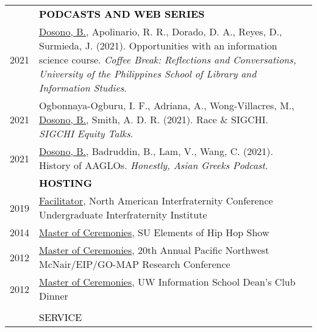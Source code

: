 \documentclass[11pt]{article}
\begin{document}
{{\begin{longtable}{Rp{0.75in}p{5.0in}}
\pagebreak

& \textcolor{black}{\uppercase{\textbf{Podcasts and Web Series}}}\\

\footnotesize{2021} &
\href{https://www.youtube.com/watch?v=CPGFnCFnm1s&ab_channel=UPSLIS}{Dosono, B.}, Apolinario, R. R., Dorado, D. A., Reyes, D., Surmieda, J. (2021). Opportunities with an information science course. \textit{Coffee Break: Reflections and Conversations, University of the Philippines School of Library and Information Studies}. \\

\footnotesize{2021} &
Ogbonnaya-Ogburu, I. F., Adriana, A., Wong-Villacres, M., \href{https://www.youtube.com/watch?v=n4El4VcPcVQ&list=PLqhXYFYmZ-VdgN7nr6KoCgtsT5x_Owr2Q&index=10&ab_channel=ACMSIGCHI}{Dosono, B.}, Smith, A. D. R. (2021). Race \& SIGCHI. \textit{SIGCHI Equity Talks}. \\

\footnotesize{2021} &
\href{https://anchor.fm/honestly-asian-greeks/episodes/Episode-1-History-of-AAGLOs-eok3em}{Dosono, B.}, Badruddin, B., Lam, V., Wang, C. (2021). History of AAGLOs. \textit{Honestly, Asian Greeks Podcast}. \\

& \textcolor{black}{\uppercase{\textbf{Hosting}}}\\

\footnotesize{2019} & \href{https://www.aflv.org/page/UIFI}{Facilitator}, North American Interfraternity Conference Undergraduate Interfraternity Institute\\

\footnotesize{2014} & \href{https://www.facebook.com/events/1495108147408350/}{Master of Ceremonies}, SU Elements of Hip Hop Show\\

\footnotesize{2012} & \href{https://www.washington.edu/omad/2012/05/14/undergraduates-to-present-research-at-20th-annual-pacific-northwest-mcnaireipgo-map-research-conference-may-17-19/}{Master of Ceremonies}, 20th Annual Pacific Northwest McNair/EIP/GO-MAP Research Conference\\

\footnotesize{2012} & \href{https://youtu.be/WMPhe6H7yiM}{Master of Ceremonies}, UW Information School Dean's Club Dinner\\
\\

\sout{\hfill} 
& \par \Large \textcolor{black}{\uppercase{Service\hspace{6pt} \sout{\hfill}}}\\


\end{longtable}}}
\end{document}
